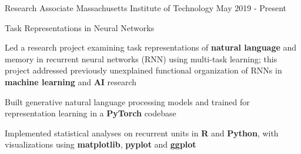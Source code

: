 

\begin{cventries}


  \blankcventry
  {Research Associate} %
  {Massachusetts Institute of Technology} %
  {May 2019 - Present} %
  {} %

  \projectentry
  {Task Representations in Neural Networks}
  {\href{https://github.com/jaffourt/Project-Portfolio/tree/main/Project2}{}} %
  {
    \begin{cvitems} %
      \item {Led a research project examining task representations of \textbf{natural language} and memory in
      recurrent neural networks (RNN) using multi-task learning; this project addressed previously unexplained
      functional organization of RNNs in \textbf{machine learning} and \textbf{AI} research}
      \item {Built generative natural language processing models and trained for representation learning in a
      \textbf{PyTorch} codebase}
      \item {Implemented statistical analyses on recurrent units in \textbf{R} and \textbf{Python}, with
      visualizations using \textbf{matplotlib}, \textbf{pyplot} and \textbf{ggplot}}
    \end{cvitems}
  }


\end{cventries}
